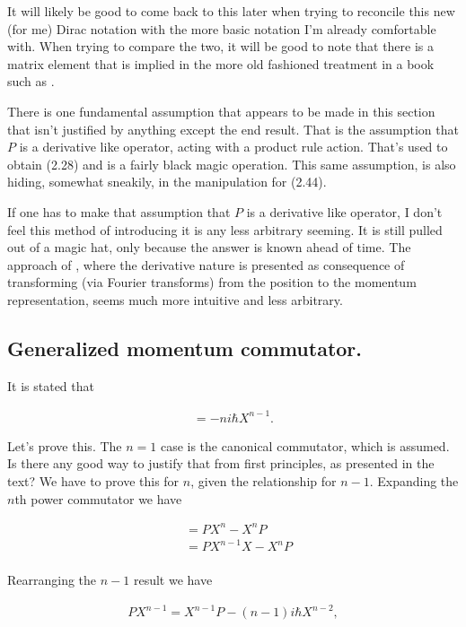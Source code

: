 It will likely be good to come back to this later when trying to reconcile this new (for me) Dirac notation with the more basic notation I'm already comfortable with.  When trying to compare the two, it will be good to note that there is a matrix element that is implied in the more old fashioned treatment in a book such as \cite{bohm1989qt}.

There is one fundamental assumption that appears to be made in this section that isn't justified by anything except the end result.  That is the assumption that $P$ is a derivative like operator, acting with a product rule action.  That's used to obtain (2.28) and is a fairly black magic operation.  This same assumption, is also hiding, somewhat sneakily, in the manipulation for (2.44).

If one has to make that assumption that $P$ is a derivative like operator, I don't feel this method of introducing it is any less arbitrary seeming.  It is still pulled out of a magic hat, only because the answer is known ahead of time.  The approach of \cite{bohm1989qt}, where the derivative nature is presented as consequence of transforming (via Fourier transforms) from the position to the momentum representation, seems much more intuitive and less arbitrary.

\subsection{Generalized momentum commutator.}

It is stated that

\begin{align*}
[P,X^n] = - n i \hbar X^{n-1}.
\end{align*}

Let's prove this.  The $n=1$ case is the canonical commutator, which is assumed.  Is there any good way to justify that from first principles, as presented in the text?  We have to prove this for $n$, given the relationship for $n-1$.  Expanding the $n$th power commutator we have

\begin{align*}
[P,X^n] 
&= P X^n - X^n P \\
&= P X^{n-1} X - X^{n } P \\
\end{align*}

Rearranging the $n-1$ result we have

\begin{align*}
P X^{n-1} = X^{n-1} P - (n-1) i \hbar X^{n-2},
\end{align*}

